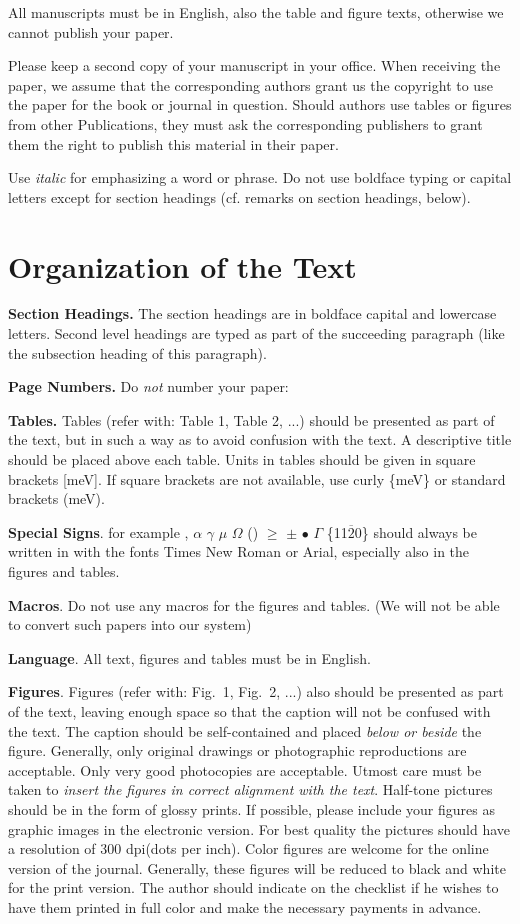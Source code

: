 \documentclass{ttp}
\begin{document}
All manuscripts must be in English, also the table and figure texts, otherwise we cannot publish your paper.

Please keep a second copy of your manuscript in your office. When receiving the paper, we assume
that the corresponding authors grant us the copyright to use the paper for the book or journal in question.
Should authors use tables or figures from other Publications, they must ask the corresponding publishers to
grant them the right to publish this material in their paper.

Use \textit{italic} for emphasizing a word or phrase.
Do not use boldface typing or capital letters except for section headings (cf. remarks on section headings, below).


\section{Organization of the Text}


\noindent \textbf{Section Headings.} The section headings are in boldface capital and lowercase letters.
Second level headings are typed as part of the succeeding paragraph (like the subsection heading of this paragraph).

\textbf{Page Numbers.} Do \textit{not} number your paper:

\textbf{Tables.} Tables (refer with: Table 1, Table 2, ...) should be presented as part of the text, but in such a
way as to avoid confusion with the text. A descriptive title should be placed above each table. Units in tables should
 be given in square brackets [meV]. If square brackets are not available, use curly \{meV\} or standard brackets (meV).

\textbf{Special Signs}. for example , $\alpha$ $\gamma$  $\mu$ $\Omega$ () $\ge$  $\pm$ $\bullet$  $\Gamma$ \{11$\overline{2}$0\} should always be written in with the
fonts Times New Roman or Arial, especially also in the figures and tables.

\textbf{Macros}. Do not use any macros for the figures and tables. (We will not be able to convert such papers into our system)
\newpage

\textbf{Language}. All text, figures and tables must be in English.

\textbf{Figures}. Figures (refer with: Fig.~1, Fig.~2, ...) also should be presented as part of the text, leaving enough space so that the
caption will not be confused with the text. The caption should be self-contained and placed \textit{below or beside }the
figure. Generally, only original drawings or photographic reproductions are acceptable. Only very good photocopies are
acceptable. Utmost care must be taken to \textit{insert the figures in correct alignment with the text}. Half-tone pictures
 should be in the form of glossy prints. If possible, please include your figures as graphic images in the electronic version.
For best quality the pictures should have a resolution of 300 dpi(dots per inch).
\noindent Color figures are welcome for the online version of the journal. Generally, these figures will be reduced to black
and white for the print version. The author should indicate on the checklist if he wishes to have them printed in full color
and make the necessary payments in advance.
\end{document}

